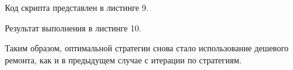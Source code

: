 Код скрипта представлен в листинге 9.



\newpage

Результат выполнения в листинге 10.



Таким образом, оптимальной стратегии снова стало использование дешевого ремонта, как и в предыдущем случае с итерации по стратегиям.